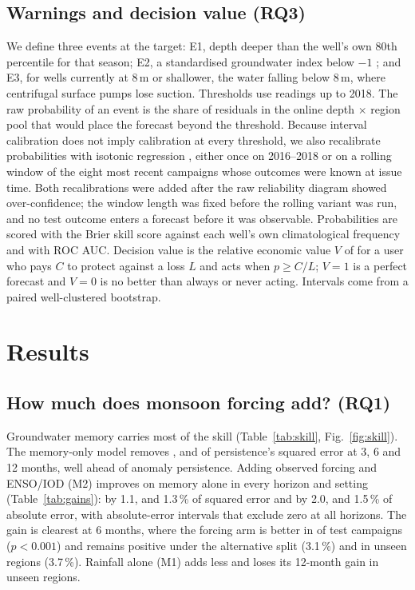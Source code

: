 \documentclass[11pt,a4paper]{article}
\begin{document}
\subsection{Warnings and decision value (RQ3)}
We define three events at the target: E1, depth deeper than the well's own 80th percentile for that season; E2, a standardised
groundwater index below $-1$ \citep{bloomfield2013sgi}; and E3, for wells currently at 8\,m or shallower, the water falling
below 8\,m, where centrifugal surface pumps lose suction. Thresholds use readings up to 2018. The raw probability of an event
is the share of residuals in the online depth $\times$ region pool that would place the forecast beyond the threshold. Because
interval calibration does not imply calibration at every threshold, we also recalibrate probabilities with isotonic regression
\citep{zadrozny2002isotonic}, either once on 2016--2018 or on a rolling window of the eight most recent campaigns whose outcomes
were known at issue time. Both recalibrations were added after the raw reliability diagram showed over-confidence; the
window length was fixed before the rolling variant was run, and no test outcome enters a forecast before it was observable. Probabilities are scored with the Brier skill score \citep{brier1950verification} against each well's
own climatological frequency and with ROC AUC. Decision value is the relative economic value $V$ of \citet{richardson2000value}
for a user who pays $C$ to protect against a loss $L$ and acts when $p \ge C/L$; $V=1$ is a perfect forecast and $V=0$ is no
better than always or never acting. Intervals come from a paired well-clustered bootstrap.

\section{Results}

\subsection{How much does monsoon forcing add? (RQ1)}

Groundwater memory carries most of the skill (Table~\ref{tab:skill}, Fig.~\ref{fig:skill}). The memory-only model removes
\skillMzeroThree, \skillMzeroSix{} and \skillMzeroTwelve{} of persistence's squared error at 3, 6 and 12 months, well ahead of
anomaly persistence. Adding observed forcing and ENSO/IOD (M2) improves on memory alone in every horizon and setting
(Table~\ref{tab:gains}): by 1.1, \gainSixMSE{} and 1.3\,\% of squared error and by 2.0, \gainSixMAE{} and 1.5\,\% of absolute error,
with absolute-error intervals that exclude zero at all horizons. The gain is clearest at 6 months, where the forcing arm is
better in \gainSixWins{} of \gainSixCampaigns{} test campaigns ($p<0.001$) and remains positive under the alternative split
(3.1\,\%) and in unseen regions (3.7\,\%). Rainfall alone (M1) adds less and loses its 12-month gain in unseen regions.
\end{document}
